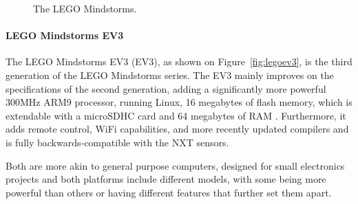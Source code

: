\begin{figure}[!tbp]
	\centering
	\hfill
	\caption{The LEGO Mindstorms.}
  \end{figure}

\paragraph{LEGO Mindstorms EV3}
The  LEGO Mindstorms EV3 (EV3), as shown on Figure~\ref{fig:legoev3}, is the third generation of the LEGO Mindstorms series.
The EV3 mainly improves on the specifications of the second generation, adding a significantly more powerful 300MHz ARM9 processor, running Linux, 16 megabytes of flash memory, which is extendable with a microSDHC card and 64 megabytes of RAM \cite{ev3userguide}.
Furthermore, it adds remote control, WiFi capabilities, and more recently updated compilers and is fully backwards-compatible with the NXT sensors\cite{ev3nxtcompatability}.

Both are more akin to general purpose computers, designed for small electronics projects and both platforms include different models, with some being more powerful than others or having different features that further set them apart.


